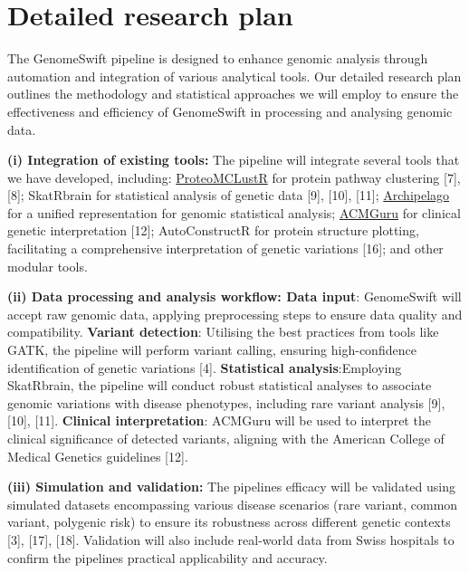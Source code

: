 
\section{Detailed research plan}\label{detailed-research-plan}

The GenomeSwift pipeline is designed to enhance genomic analysis through
automation and integration of various analytical tools. Our detailed
research plan outlines the methodology and statistical approaches we
will employ to ensure the effectiveness and efficiency of GenomeSwift in
processing and analysing genomic data.

\textbf{(i) Integration of existing tools:} The pipeline will integrate
several tools that we have developed, including:
\href{https://github.com/DylanLawless/ProteoMCLustR}{ProteoMCLustR} for
protein pathway clustering {[}7{]}, {[}8{]}; SkatRbrain for statistical
analysis of genetic data {[}9{]}, {[}10{]}, {[}11{]};
\href{https://github.com/DylanLawless/archipelago}{Archipelago} for a
unified representation for genomic statistical analysis;
\href{https://github.com/DylanLawless/ACMGuru}{ACMGuru} for clinical
genetic interpretation {[}12{]}; AutoConstructR for protein structure
plotting, facilitating a comprehensive interpretation of genetic
variations {[}16{]}; and other modular tools.

\textbf{(ii) Data processing and analysis workflow: Data input}:
GenomeSwift will accept raw genomic data, applying preprocessing steps
to ensure data quality and compatibility. \textbf{Variant detection}:
Utilising the best practices from tools like GATK, the pipeline will
perform variant calling, ensuring high-confidence identification of
genetic variations {[}4{]}. \textbf{Statistical analysis}:Employing
SkatRbrain, the pipeline will conduct robust statistical analyses to
associate genomic variations with disease phenotypes, including rare
variant analysis {[}9{]}, {[}10{]}, {[}11{]}. \textbf{Clinical
interpretation}: ACMGuru will be used to interpret the clinical
significance of detected variants, aligning with the American College of
Medical Genetics guidelines {[}12{]}.

\textbf{(iii) Simulation and validation:} The pipeline\textquotesingle s
efficacy will be validated using simulated datasets encompassing various
disease scenarios (rare variant, common variant, polygenic risk) to
ensure its robustness across different genetic contexts {[}3{]},
{[}17{]}, {[}18{]}. Validation will also include real-world data from
Swiss hospitals to confirm the pipeline\textquotesingle s practical
applicability and accuracy.

